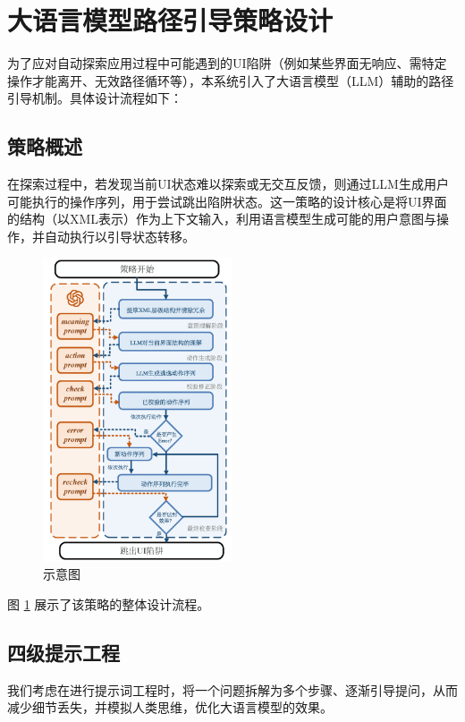 \documentclass{article}
\begin{document}
\section{大语言模型路径引导策略设计}

为了应对自动探索应用过程中可能遇到的UI陷阱（例如某些界面无响应、需特定操作才能离开、无效路径循环等），本系统引入了大语言模型（LLM）辅助的路径引导机制。具体设计流程如下：

\subsection{策略概述}
在探索过程中，若发现当前UI状态难以探索或无交互反馈，则通过LLM生成用户可能执行的操作序列，用于尝试跳出陷阱状态。这一策略的设计核心是将UI界面的结构（以XML表示）作为上下文输入，利用语言模型生成可能的用户意图与操作，并自动执行以引导状态转移。


\begin{figure}[H]
    \centering
    \includegraphics[width=0.5\textwidth]{3.png}
    \caption{示意图}
    \label{fig:strategy_overview}
\end{figure}

图 \ref{fig:strategy_overview} 展示了该策略的整体设计流程。

\subsection{四级提示工程}


我们考虑在进行提示词工程时，将一个问题拆解为多个步骤、逐渐引导提问，从而减少细节丢失，并模拟人类思维，优化大语言模型的效果。
\end{document}
